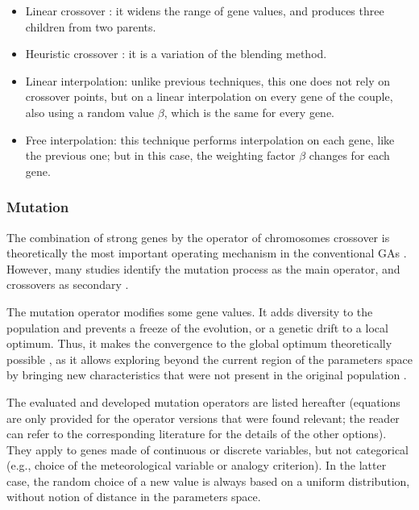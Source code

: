 \documentclass{ametsoc}
\begin{document}
\begin{itemize}
	\item Linear crossover \citep{Wright1991a}: it widens the range of gene values, and produces three children from two parents.
	
	\item Heuristic crossover \citep{Michalewicz1996}: it is a variation of the blending method.
	
	\item Linear interpolation: unlike previous techniques, this one does not rely on crossover points, but on a linear interpolation on every gene of the couple, also using a random value $\beta$, which is the same for every gene.
	
	\item Free interpolation: this technique performs interpolation on each gene, like the previous one; but in this case, the weighting factor $\beta$ changes for each gene.
	
\end{itemize}


\subsubsection{Mutation}
\label{sec:gas:mutation}

The combination of strong genes by the operator of chromosomes crossover is theoretically the most important operating mechanism in the conventional GAs \citep{Holland1992b,Back1993b}. However, many studies identify the mutation process as the main operator, and crossovers as secondary \citep[see][]{Back1992a, Back1996a, Back1996b, Smith1997a, Deb1999, Costa2005a, Costa2007a}.

The mutation operator modifies some gene values. It adds diversity to the population and prevents a freeze of the evolution, or a genetic drift to a local optimum. Thus, it makes the convergence to the global optimum theoretically possible \citep{Beasley1993a}, as it allows exploring beyond the current region of the parameters space by bringing new characteristics that were not present in the original population \citep{Haupt2004}. 

The evaluated and developed mutation operators are listed hereafter (equations are only provided for the operator versions that were found relevant; the reader can refer to the corresponding literature for the details of the other options). They apply to genes made of continuous or discrete variables, but not categorical (e.g., choice of the meteorological variable or analogy criterion). In the latter case, the random choice of a new value is always based on a uniform distribution, without notion of distance in the parameters space.
\end{document}
